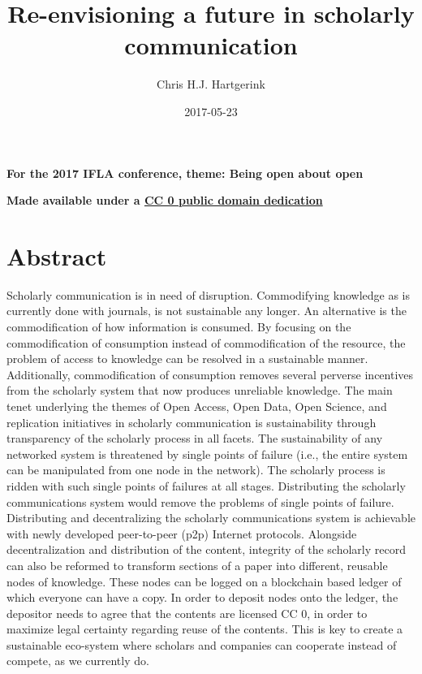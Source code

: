 \documentclass[]{tufte-book}
\title{Re-envisioning a future in scholarly communication}
\author{Chris H.J. Hartgerink}
\date{2017-05-23}
\begin{document}
\maketitle




\textbf{For the 2017 IFLA conference, theme: Being open about open}

\textbf{Made available under a
\href{https://creativecommons.org/publicdomain/zero/1.0/legalcode}{CC 0
public domain dedication}}

\section{Abstract}\label{abstract}

Scholarly communication is in need of disruption. Commodifying knowledge
as is currently done with journals, is not sustainable any longer. An
alternative is the commodification of how information is consumed. By
focusing on the commodification of consumption instead of
commodification of the resource, the problem of access to knowledge can
be resolved in a sustainable manner. Additionally, commodification of
consumption removes several perverse incentives from the scholarly
system that now produces unreliable knowledge. The main tenet underlying
the themes of Open Access, Open Data, Open Science, and replication
initiatives in scholarly communication is sustainability through
transparency of the scholarly process in all facets. The sustainability
of any networked system is threatened by single points of failure (i.e.,
the entire system can be manipulated from one node in the network). The
scholarly process is ridden with such single points of failures at all
stages. Distributing the scholarly communications system would remove
the problems of single points of failure. Distributing and
decentralizing the scholarly communications system is achievable with
newly developed peer-to-peer (p2p) Internet protocols. Alongside
decentralization and distribution of the content, integrity of the
scholarly record can also be reformed to transform sections of a paper
into different, reusable nodes of knowledge. These nodes can be logged
on a blockchain based ledger of which everyone can have a copy. In order
to deposit nodes onto the ledger, the depositor needs to agree that the
contents are licensed CC 0, in order to maximize legal certainty
regarding reuse of the contents. This is key to create a sustainable
eco-system where scholars and companies can cooperate instead of
compete, as we currently do.
\end{document}
